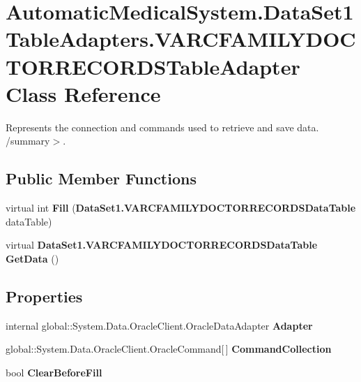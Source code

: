 \section{AutomaticMedicalSystem.DataSet1TableAdapters.VARCFAMILYDOCTORRECORDSTableAdapter Class Reference}
\label{class_automatic_medical_system_1_1_data_set1_table_adapters_1_1_v_a_r_c_f_a_m_i_l_y_d_o_c_t_o_r_r_e_c_o_r_d_s_table_adapter}
Represents the connection and commands used to retrieve and save data. /summary$>$.  


\subsection*{Public Member Functions}
\begin{CompactItemize}
\item 
virtual int \textbf{Fill} ({\bf DataSet1.VARCFAMILYDOCTORRECORDSDataTable} dataTable)\label{class_automatic_medical_system_1_1_data_set1_table_adapters_1_1_v_a_r_c_f_a_m_i_l_y_d_o_c_t_o_r_r_e_c_o_r_d_s_table_adapter_7dff25a936b5687d0977e356efd98711}

\item 
virtual {\bf DataSet1.VARCFAMILYDOCTORRECORDSDataTable} \textbf{GetData} ()\label{class_automatic_medical_system_1_1_data_set1_table_adapters_1_1_v_a_r_c_f_a_m_i_l_y_d_o_c_t_o_r_r_e_c_o_r_d_s_table_adapter_6c368d1da0c0c7a965ffcb85973c65f9}

\end{CompactItemize}
\subsection*{Properties}
\begin{CompactItemize}
\item 
internal global::System.Data.OracleClient.OracleDataAdapter \textbf{Adapter}\hspace{0.3cm}{\tt  [get]}\label{class_automatic_medical_system_1_1_data_set1_table_adapters_1_1_v_a_r_c_f_a_m_i_l_y_d_o_c_t_o_r_r_e_c_o_r_d_s_table_adapter_be4e0ee0728044cb7a3e38dc68b868e8}

\item 
global::System.Data.OracleClient.OracleCommand[$\,$] \textbf{CommandCollection}\hspace{0.3cm}{\tt  [get]}\label{class_automatic_medical_system_1_1_data_set1_table_adapters_1_1_v_a_r_c_f_a_m_i_l_y_d_o_c_t_o_r_r_e_c_o_r_d_s_table_adapter_a80df5b984e5350085991d2f7ea53258}

\item 
bool \textbf{ClearBeforeFill}\hspace{0.3cm}{\tt  [get, set]}\label{class_automatic_medical_system_1_1_data_set1_table_adapters_1_1_v_a_r_c_f_a_m_i_l_y_d_o_c_t_o_r_r_e_c_o_r_d_s_table_adapter_25b64fe565ab5f7194c6f872e21bd997}

\end{CompactItemize}


